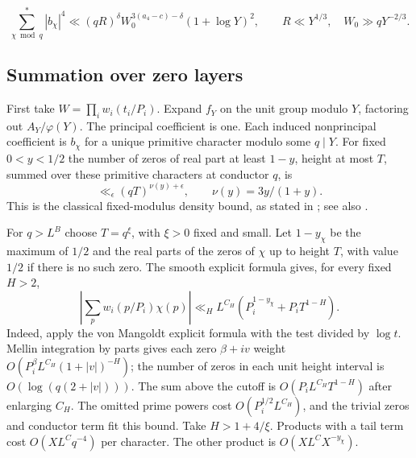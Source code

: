 \documentclass[11pt,a4paper]{article}
\theoremstyle{paperplain}
\numberwithin{equation}{section}
\begin{document}
\begin{equation}\label{six:eq-six-low-quart}
 \sum_{\chi\bmod q}^{*}|b_\chi|^4
 \ll(qR)^\delta W_0^{3(a_4-c)-\delta}(1+\log Y)^2,\qquad
 R\ll Y^{1/3},\quad W_0\gg qY^{-2/3}.
\end{equation}

\subsection{Summation over zero layers}
First take \(W=\prod_i w_i(t_i/P_i)\). Expand \(f_Y\) on the unit
group modulo \(Y\), factoring out \(A_Y/\varphi(Y)\). The principal
coefficient is one. Each induced nonprincipal coefficient is
\(b_\chi\) for a unique primitive character modulo some \(q\mid Y\).
For fixed \(0<y<1/2\) the number of zeros of real part at least
\(1-y\), height at most \(T\), summed over these primitive
characters at conductor \(q\), is
\[
 \ll_\epsilon(qT)^{\nu(y)+\epsilon},\qquad
 \nu(y)=3y/(1+y).
\]
This is the classical fixed-modulus density bound, as stated in
\cite[(1.4)]{ChenGuptaLi2026}; see also \cite[(2.5)]{FortiViola1973}.

For \(q>L^B\) choose \(T=q^\xi\), with \(\xi>0\) fixed and small.
Let \(1-y_\chi\) be the maximum of \(1/2\) and the real parts of the
zeros of \(\chi\) up to height \(T\), with value \(1/2\) if there is
no such zero. The smooth explicit formula gives, for every fixed \(H>2\),
\[
 \left|\sum_p w_i(p/P_i)\chi(p)\right|
 \ll_H L^{C_H}(P_i^{1-y_\chi}+P_i T^{1-H}).
\]
Indeed, apply the von Mangoldt explicit formula with the test divided
by \(\log t\). Mellin integration by parts gives each zero
\(\beta+iv\) weight \(O(P_i^\beta L^{C_H}(1+|v|)^{-H})\); the
number of zeros in each unit height interval is \(O(\log(q(2+|v|)))\).
The sum above the cutoff is \(O(P_i L^{C_H}T^{1-H})\) after enlarging
\(C_H\). The omitted prime powers cost \(O(P_i^{1/2}L^{C_H})\),
and the trivial zeros and conductor term fit this bound.
Take \(H>1+4/\xi\). Products with a tail term cost
\(O(XL^Cq^{-4})\) per character. The other product is
\(O(XL^C X^{-y_\chi})\).
\end{document}
